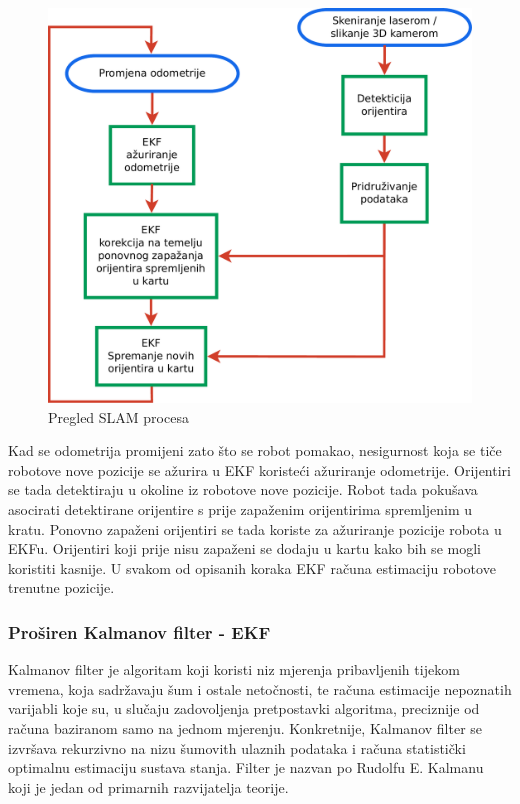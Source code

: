 
\begin{figure}[h]
\renewcommand{\figurename}{Grafikon}
\centering
\includegraphics[scale=0.4]{figures/slam-overview.pdf}
\caption{Pregled SLAM procesa}
\label{fig:slam-overview.pdf}
\end{figure}

Kad se odometrija promijeni zato što se robot pomakao, nesigurnost koja se
tiče robotove nove pozicije se ažurira u EKF koristeći ažuriranje
odometrije. Orijentiri se tada detektiraju u okoline iz robotove nove
pozicije. Robot tada pokušava asocirati detektirane orijentire s prije zapaženim
orijentirima spremljenim u kratu. Ponovno zapaženi orijentiri se tada koriste za ažuriranje
pozicije robota u EKFu. Orijentiri koji prije nisu zapaženi se dodaju u
kartu kako bih se mogli koristiti kasnije. U svakom od opisanih koraka EKF
računa estimaciju robotove trenutne pozicije. 

\subsubsection{Proširen Kalmanov filter - EKF} %
\label{ssub:Proširen Kalmanov filter - EKF}

Kalmanov filter je algoritam koji koristi niz mjerenja pribavljenih
tijekom vremena, koja sadržavaju šum i ostale netočnosti, te računa
estimacije nepoznatih varijabli koje su, u slučaju zadovoljenja
pretpostavki algoritma, preciznije od računa baziranom samo na jednom
mjerenju. Konkretnije, Kalmanov filter se izvršava rekurzivno na nizu
šumovith ulaznih podataka i računa statistički optimalnu estimaciju
sustava stanja. Filter je nazvan po Rudolfu E. Kalmanu~\cite{Kalman}
koji je jedan od primarnih razvijatelja teorije.


